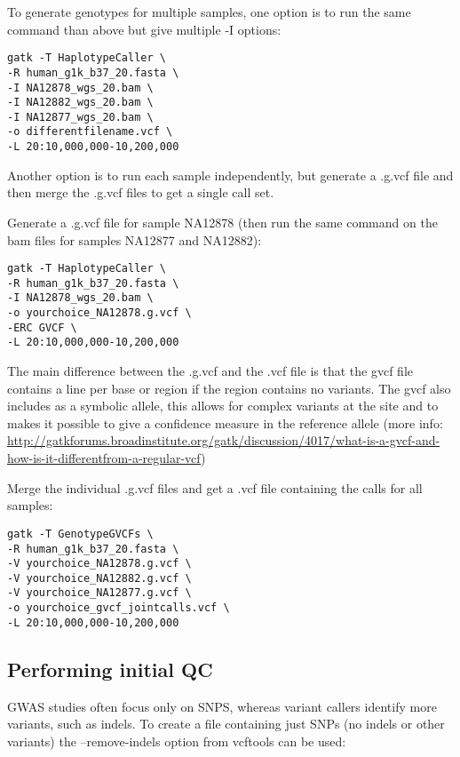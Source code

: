 \documentclass[]{book}
\begin{document}
To generate genotypes for multiple samples, one option is to run the
same command than above but give multiple -I options:

\begin{verbatim}
gatk -T HaplotypeCaller \
-R human_g1k_b37_20.fasta \
-I NA12878_wgs_20.bam \
-I NA12882_wgs_20.bam \
-I NA12877_wgs_20.bam \
-o differentfilename.vcf \
-L 20:10,000,000-10,200,000
\end{verbatim}

Another option is to run each sample independently, but generate a
.g.vcf file and then merge the .g.vcf files to get a single call set.

Generate a .g.vcf file for sample NA12878 (then run the same command on
the bam files for samples NA12877 and NA12882):

\begin{verbatim}
gatk -T HaplotypeCaller \
-R human_g1k_b37_20.fasta \
-I NA12878_wgs_20.bam \
-o yourchoice_NA12878.g.vcf \
-ERC GVCF \
-L 20:10,000,000-10,200,000
\end{verbatim}

The main difference between the .g.vcf and the .vcf file is that the
gvcf file contains a line per base or region if the region contains no
variants. The gvcf also includes as a symbolic allele, this allows for
complex variants at the site and to makes it possible to give a
confidence measure in the reference allele (more info:
\url{http://gatkforums.broadinstitute.org/gatk/discussion/4017/what-is-a-gvcf-and-how-is-it-differentfrom-a-regular-vcf})

Merge the individual .g.vcf files and get a .vcf file containing the
calls for all samples:

\begin{verbatim}
gatk -T GenotypeGVCFs \
-R human_g1k_b37_20.fasta \
-V yourchoice_NA12878.g.vcf \
-V yourchoice_NA12882.g.vcf \
-V yourchoice_NA12877.g.vcf \
-o yourchoice_gvcf_jointcalls.vcf \
-L 20:10,000,000-10,200,000
\end{verbatim}

\subsection{Performing initial QC}\label{performing-initial-qc}

GWAS studies often focus only on SNPS, whereas variant callers identify
more variants, such as indels. To create a file containing just SNPs (no
indels or other variants) the --remove-indels option from vcftools can
be used:
\end{document}
